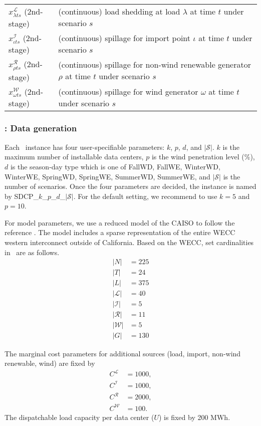 \begin{table}[H]
{\begin{tabular}{ll}
			$x_{\lambda ts}^\mathcal{L}$	(2nd-stage) & (continuous) load shedding at load $\lambda$ at time $t$ under scenario $s$	\\
			$x_{\iota ts}^\mathcal{I}$	(2nd-stage) &	(continuous) spillage for import point $\iota$ at time $t$ under scenario $s$\\
			$x_{\rho ts}^\mathcal{R}$ (2nd-stage)	& (continuous) spillage for non-wind renewable generator $\rho$ at time $t$ under scenario $s$  	\\
			$x_{\omega ts}^\mathcal{W}$ (2nd-stage)	& (continuous) spillage for wind generator $\omega$ at time $t$ under scenario $s$ 	\\
			\hline
		\end{tabular}
	}
\end{table}

\subsubsection{\sdcp: Data generation}
Each \sdcp\ instance has four user-specifiable parameters: $k$, $p$, $d$, and $|\mathcal{S}|$. $k$ is the maximum number of installable data centers, $p$ is the wind penetration level (\%), $d$ is the season-day type which is one of FallWD, FallWE, WinterWD, WinterWE, SpringWD, SpringWE, SummerWD, SummerWE, and $|\mathcal{S}|$ is the number of scenarios. Once the four parameters are decided, the instance is named by SDCP\_$k$\_$p$\_$d$\_$|\mathcal{S}|$. For the default setting, we recommend to use $k=5$ and $p=10$.

For model parameters, we use a reduced model of the CAISO to follow the reference \cite{journal:KYZC2017}. The model includes a sparse representation of the entire WECC western interconnect outside of California. 
Based on the WECC, set cardinalities in \sdcp\ are as follows.
\begin{align*}
|N|&=225 \\
|T|&=24 \\
|L|&=375 \\
|\mathcal{L}|&=40\\
|\mathcal{I}|&=5\\
|\mathcal{R}|&=11\\
|\mathcal{W}|&=5\\
|G|&=130
\end{align*}

The marginal cost parameters for additional sources (load, import, non-wind renewable, wind) are fixed by
\begin{align*}
C^\mathcal{L}&=1000,\\
C^\mathcal{I}&=1000,\\
C^\mathcal{R}&=2000,\\
C^\mathcal{W}&=100.
\end{align*}
The dispatchable load capacity per data center ($U$) is fixed by 200 MWh.

